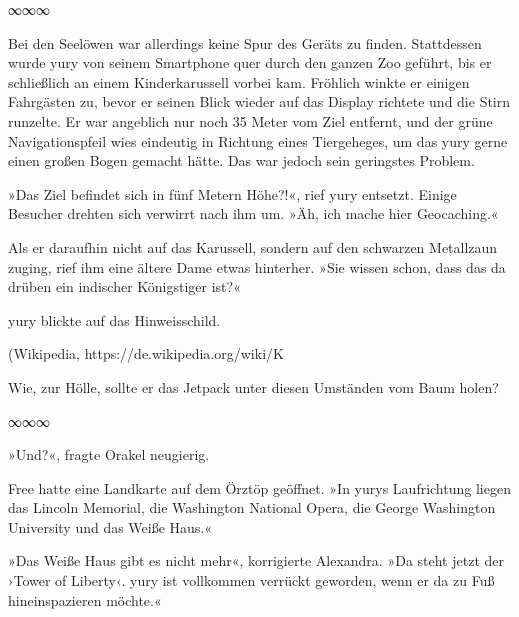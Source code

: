 \begin{center}
	∞∞∞
\end{center}

Bei den Seelöwen war allerdings keine Spur des Geräts zu finden. Stattdessen wurde yury von seinem Smartphone quer durch den ganzen Zoo geführt, bis er schließlich an einem Kinderkarussell vorbei kam. Fröhlich winkte er einigen Fahrgästen zu, bevor er seinen Blick wieder auf das Display richtete und die Stirn runzelte. Er war angeblich nur noch 35 Meter vom Ziel entfernt, und der grüne Navigationspfeil wies eindeutig in Richtung eines Tiergeheges, um das yury gerne einen großen Bogen gemacht hätte. Das war jedoch sein geringstes Problem.

»Das Ziel befindet sich in fünf Metern Höhe?!«, rief yury entsetzt. Einige Besucher drehten sich verwirrt nach ihm um. »Äh, ich mache hier Geocaching.«

Als er daraufhin nicht auf das Karussell, sondern auf den schwarzen Metallzaun zuging, rief ihm eine ältere Dame etwas hinterher. »Sie wissen schon, dass das da drüben ein indischer Königstiger ist?«

yury blickte auf das Hinweisschild.

 (Wikipedia, https://de.wikipedia.org/wiki/K%

Wie, zur Hölle, sollte er das Jetpack unter diesen Umständen vom Baum holen?

\begin{center}
	∞∞∞
\end{center}

»Und?«, fragte Orakel neugierig.

Free hatte eine Landkarte auf dem Örztöp geöffnet. »In yurys Laufrichtung liegen das Lincoln Memorial, die Washington National Opera, die George Washington University und das Weiße Haus.«

»Das Weiße Haus gibt es nicht mehr«, korrigierte Alexandra. »Da steht jetzt der ›Tower of Liberty‹. yury ist vollkommen verrückt geworden, wenn er da zu Fuß hineinspazieren möchte.«


